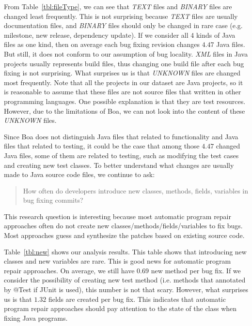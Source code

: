 \documentclass{sig-alternate-05-2015}
\begin{document}
From Table~\ref{tbl:fileType}, we can see that \emph{TEXT} files and
\emph{BINARY} files are changed least frequently. This is not surprising because
\emph{TEXT} files are usually documentation files, and \emph{BINARY} files
should only be changed in rare case (e.g.  milestone, new release, dependency
update). If we consider all 4 kinds of Java files as one kind, then on average
each bug fixing revision changes $4.47$ Java files. But still, it does not
conform to our assumption of bug locality. \emph{XML} files in Java projects
usually represents build files, thus changing one build file after each bug
fixing is not surprising.  What surprises us is that \emph{UNKNOWN} files are
changed most frequently. Note that all the projects in our dataset are Java
projects, so it is reasonable to assume that these files are not source files
that written in other programming languages.  One possible explanation is that
they are test resources. However, due to the limitations of Boa, we can not look
into the content of these \emph{UNKNOWN} files. 

Since Boa does not distinguish Java files that related to functionality and Java
files that related to testing, it could be the case that among those $4.47$
changed Java files, some of them are related to testing, such as modifying the
test cases and creating new test classes. To better understand what changes are
usually made to Java source code files, we continue to ask:

\begin{quote}
	How often do developers introduce new classes, methods, fields, variables in
	bug fixing commits?
\end{quote}

This research question is interesting because most automatic program repair
approaches often do not create new classes/methods/fields/variables to fix bugs.
Most approaches guess and synthesize the patches based on existing source code.

Table~\ref{tbl:new} shows our analysis results. This table shows that
introducing new classes and new variables are rare. This is good news for
automatic program repair approaches. On average, we still have $0.69$ new method
per bug fix. If we consider the possibility of creating new test method (i.e.
methods that annotated by @Test if JUnit is used), this number is not that
scary. However, what surprises us is that $1.32$ fields are created per bug fix.
This indicates that automatic program repair approaches should pay attention to
the state of the class when fixing Java programs.
\end{document}
